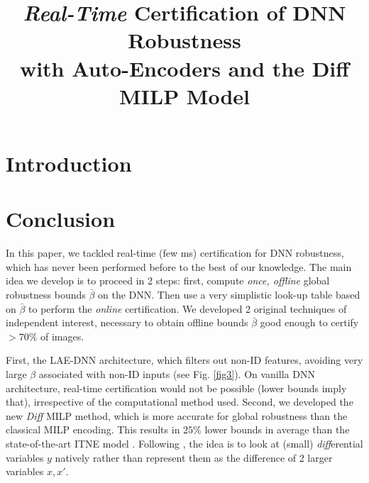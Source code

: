 \documentclass{article}
\title{ 
{\em Real-Time} Certification of DNN Robustness
\\ with Auto-Encoders and the Diff MILP Model}
\author{%
}
\begin{document}
	
	
	\maketitle
	
	
\begin{abstract}
	
\end{abstract}
	
	
	\section{Introduction}
	
	
	
	
	
	
	
	
	
\newpage

	

	
	
	
	

	
	
	
	
	
	\section{Conclusion}
	In this paper, we tackled real-time (few ms) certification for DNN robustness, which has never been performed before to the best of our knowledge. The main idea we develop is to proceed in 2 steps: first, compute {\em once, offline} global robustness bounds $\bar{\beta}$ on the DNN. Then use a very simplistic look-up table based on $\bar{\beta}$ to perform the {\em online} certification.	We developed 2 original techniques of independent interest, necessary to obtain offline bounds $\bar{\beta}$ good enough to certify $>70\%$ of images. 
	
	First, the LAE-DNN architecture, which filters out non-ID features, avoiding very large $\beta$ associated with 
	non-ID inputs (see Fig. \ref{fig3}). On vanilla DNN architecture, real-time certification would not be possible (lower bounds imply that), irrespective of the computational method used.
	Second, we developed the new {\em Diff} MILP method, which is more accurate for global robustness than the classical MILP encoding. This results in $25\%$ lower bounds in average than the state-of-the-art ITNE model \cite{ITNE}. Following \cite{diff}, the idea is to look at (small) {\em diff}erential variables $y$ natively rather than represent them as the difference of 2 larger variables $x,x'$.
	
\end{document}
